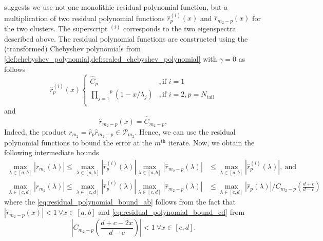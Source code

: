 \citeauthor{cg_sharpened_convrate_Axelsson1976} suggests we use not one monolithic residual polynomial function, but a multiplication of two residual polynomial functions $\hat{r}^{(i)}_p(x)$ and $\hat{r}_{m_2-p}(x)$ for the two clusters. The superscript $^{(i)}$ corresponds to the two eigenspectra described above. The residual polynomial functions are constructed using the (transformed) Chebyshev polynomials from \cref{def:chebyshev_polynomial,def:scaled_chebyshev_polynomial} with $\gamma = 0$ as follows
\begin{equation}
    \hat{r}^{(i)}_p (x)
    \begin{cases}
        \hat{C}_p                                            & , \text{if } i = 1                      \\
        \overset{p}{\underset{j=1}{\prod}} (1 - x/\lambda_j) & , \text{if } i = 2, p = N_{\text{tail}} \\
    \end{cases}
    \label{eq:residual_polynomial_rm}
\end{equation}
and
\begin{equation}
    \hat{r}_{{m_2}-p} (x) = \hat{C}_{m_2-p},
    \label{eq:residual_polynomial_rpm}
\end{equation}
Indeed, the product $r_{m_2} = \hat{r}_p \hat{r}_{m_2-p} \in \mathcal{P}_{m_2}$. Hence, we can use the residual polynomial functions to bound the error at the $m^{\text{th}}$ iterate. Now, we obtain the following intermediate bounds
\begin{subequations}
    \begin{align}
        \max_{\lambda \in [a,b]} |r_{m_2}(\lambda)| \leq \max_{\lambda \in [a,b]} |\hat{r}^{(i)}_p(\lambda)| \max_{\lambda \in [a,b]} |\hat{r}_{m_2-p}(\lambda)| & \leq \max_{\lambda \in [a,b]} |\hat{r}^{(i)}_p(\lambda)|, \ \text{and} \label{eq:residual_polynomial_bound_ab}                     \\
        \max_{\lambda \in [c,d]} |r_{m_2}(\lambda)| \leq \max_{\lambda \in [c,d]} |\hat{r}^{(i)}_p(\lambda)| \max_{\lambda \in [c,d]} |\hat{r}_{m_2-p}(\lambda)| & \leq \max_{\lambda \in [c,d]} |\hat{r}_{p}(\lambda)|/C_{m_2-p}\left(\frac{d+c}{d-c}\right) \label{eq:residual_polynomial_bound_cd}
    \end{align}
\end{subequations}
where the \cref{eq:residual_polynomial_bound_ab} follows from the fact that $|\hat{r}_{m_2-p}(x)| < 1 \ \forall x \in [a,b]$ and \cref{eq:residual_polynomial_bound_cd} from
\[
    \left|C_{m_2-p}\left(\frac{d+c -2x}{d-c}\right)\right| < 1 \ \forall x \in [c,d].
\]

